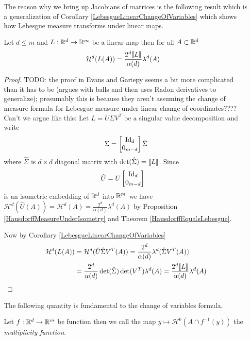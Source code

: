 The reason why we bring up Jacobians of matrices is the following result which is a generalization of Corollary \ref{LebesgueLinearChangeOfVariables}
which shows how Lebesgue measure transforms under linear maps.
\begin{lem}Let $d \leq m$ and $L : \mathbb{R}^d \to \mathbb{R}^m$ be a linear map then for all $A \subset \mathbb{R}^d$
\begin{align*}
\mathcal{H}^d(L(A)) &= \frac{2^d \llbracket L \rrbracket }{\alpha(d)} \lambda^d(A)
\end{align*}
\end{lem}
\begin{proof}
TODO: the proof in Evans and Gariepy seems a bit more complicated than it has to be (argues with balls and then uses Radon derivatives to generalize); presumably this is because they aren't assuming the change of measure formula for Lebesgue measure under linear change of coordinates????  Can't we argue like this:
Let $L = U \Sigma V^T$ be a singular value decomposition and write 
\begin{align*}
\Sigma = \begin{bmatrix}
\operatorname*{Id}_d \\
0_{m-d}
\end{bmatrix}
\hat{\Sigma}
\end{align*}
where $\hat{\Sigma}$ is $d \times d$ diagonal matrix with $\det(\hat{\Sigma}) = \llbracket L \rrbracket$.  Since 
\begin{align*}
\hat{U} &=  U \begin{bmatrix}
\operatorname*{Id}_d \\
0_{m-d}
\end{bmatrix}
\end{align*}
is an isometric embedding of $\mathbb{R}^d$ into $\mathbb{R}^m$ we have $\mathcal{H}^d(\hat{U}(A)) =\mathcal{H}^d(A)  = \frac{2^d}{\alpha(d)} \lambda^d(A)$
by Proposition \ref{HausdorffMeasureUnderIsometry} and Theorem \ref{HausdorffEqualsLebesgue}.

Now by Corollary \ref{LebesgueLinearChangeOfVariables}
\begin{align*}
\mathcal{H}^d(L(A)) &= \mathcal{H}^d(\hat{U} \hat{\Sigma} V^T(A)) = \frac{2^d}{\alpha(d)} \lambda^d(\hat{\Sigma} V^T(A)) \\
&= \frac{2^d}{\alpha(d)} \det(\hat{\Sigma}) \det(V^T) \lambda^d(A) = \frac{2^d \llbracket L \rrbracket }{\alpha(d)} \lambda^d(A)
\end{align*}
\end{proof}

The following quantity is fundamental to the change of variables formula.
\begin{defn}Let $f : \mathbb{R}^d \to \mathbb{R}^m$ be function then we call the map $y \mapsto \mathcal{H}^0( A \cap f^{-1} (y))$ the \emph{multiplicity function}.
\end{defn}

